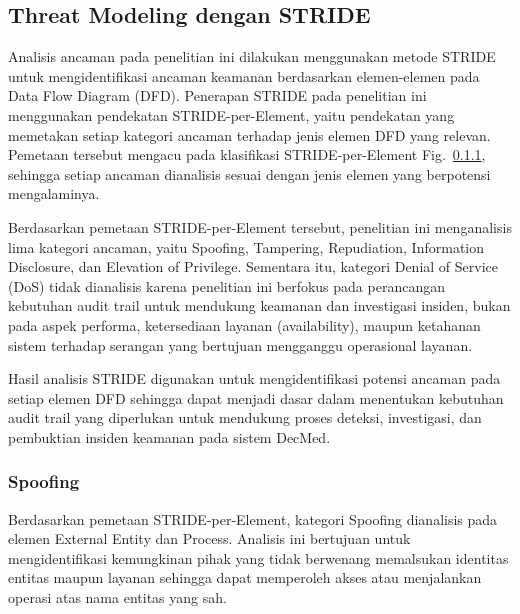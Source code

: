 \subsection{Threat Modeling dengan STRIDE}

Analisis ancaman pada penelitian ini dilakukan menggunakan metode STRIDE untuk mengidentifikasi ancaman keamanan berdasarkan elemen-elemen pada Data Flow Diagram (DFD). Penerapan STRIDE pada penelitian ini menggunakan pendekatan STRIDE-per-Element, yaitu pendekatan yang memetakan setiap kategori ancaman terhadap jenis elemen DFD yang relevan. Pemetaan tersebut mengacu pada klasifikasi STRIDE-per-Element Fig.~\ref{}, sehingga setiap ancaman dianalisis sesuai dengan jenis elemen yang berpotensi mengalaminya.

Berdasarkan pemetaan STRIDE-per-Element tersebut, penelitian ini menganalisis lima kategori ancaman, yaitu Spoofing, Tampering, Repudiation, Information Disclosure, dan Elevation of Privilege. Sementara itu, kategori Denial of Service (DoS) tidak dianalisis karena penelitian ini berfokus pada perancangan kebutuhan audit trail untuk mendukung keamanan dan investigasi insiden, bukan pada aspek performa, ketersediaan layanan (availability), maupun ketahanan sistem terhadap serangan yang bertujuan mengganggu operasional layanan.

Hasil analisis STRIDE digunakan untuk mengidentifikasi potensi ancaman pada setiap elemen DFD sehingga dapat menjadi dasar dalam menentukan kebutuhan audit trail yang diperlukan untuk mendukung proses deteksi, investigasi, dan pembuktian insiden keamanan pada sistem DecMed.



\subsubsection{Spoofing}

Berdasarkan pemetaan STRIDE-per-Element, kategori Spoofing dianalisis pada elemen External Entity dan Process. Analisis ini bertujuan untuk mengidentifikasi kemungkinan pihak yang tidak berwenang memalsukan identitas entitas maupun layanan sehingga dapat memperoleh akses atau menjalankan operasi atas nama entitas yang sah.

